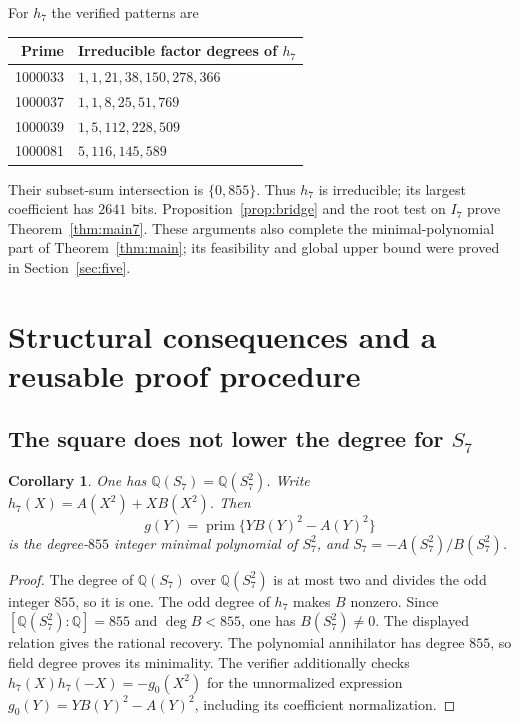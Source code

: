 \documentclass[11pt]{article}
\newtheorem{corollary}[theorem]{Corollary}
\newcommand{\Q}{\mathbb Q}
\begin{document}
For $h_7$ the verified patterns are
\begin{center}\small
\begin{tabular}{rl}
\toprule Prime&Irreducible factor degrees of $h_7$\\\midrule
1000033&$1,1,21,38,150,278,366$\\
1000037&$1,1,8,25,51,769$\\
1000039&$1,5,112,228,509$\\
1000081&$5,116,145,589$\\\bottomrule
\end{tabular}
\end{center}
Their subset-sum intersection is $\{0,855\}$. Thus $h_7$ is irreducible;
its largest coefficient has $2641$ bits. Proposition~\ref{prop:bridge}
and the root test on $I_7$ prove Theorem~\ref{thm:main7}.
These arguments also complete the minimal-polynomial part of
Theorem~\ref{thm:main}; its feasibility and global upper bound were proved
in Section~\ref{sec:five}.

\section{Structural consequences and a reusable proof procedure}\label{sec:structure}
\subsection{The square does not lower the degree for \texorpdfstring{$S_7$}{S7}}
\begin{corollary}\label{cor:odd-square}
One has $\Q(S_7)=\Q(S_7^2)$. Write
$h_7(X)=A(X^2)+XB(X^2)$. Then
\[
 g(Y)=\operatorname{prim}\{YB(Y)^2-A(Y)^2\}
\]
is the degree-$855$ integer minimal polynomial of $S_7^2$, and
$S_7=-A(S_7^2)/B(S_7^2)$.
\end{corollary}
\begin{proof}
The degree of $\Q(S_7)$ over $\Q(S_7^2)$ is at most two and divides
the odd integer $855$, so it is one. The odd degree of $h_7$ makes $B$ nonzero. Since
$[\Q(S_7^2):\Q]=855$ and $\deg B<855$, one has
$B(S_7^2)\ne0$. The displayed relation gives the rational recovery.
The polynomial annihilator has degree $855$, so field degree proves
its minimality. The verifier additionally checks
$h_7(X)h_7(-X)=-g_0(X^2)$ for the unnormalized expression
$g_0(Y)=YB(Y)^2-A(Y)^2$, including its coefficient normalization.
\end{proof}
\end{document}
